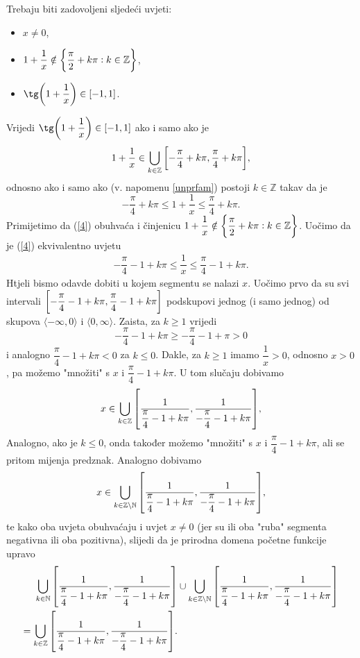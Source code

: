 \documentclass{book}
\let\originalleft\left
\let\originalright\right
\renewcommand{\left}{\mathopen{}\mathclose\bgroup\originalleft}
\renewcommand{\right}{\aftergroup\egroup\originalright}
\renewenvironment{proof}{%
    \vspace{-\parskip}\begin{oldproof}%
    }{%
    \end{oldproof}%
}
\theoremstyle{definition}
\theoremstyle{definition}
\theoremstyle{remark}
\begin{document}
\begin{proof}[Rješenje]
Trebaju biti zadovoljeni sljedeći uvjeti:
\begin{itemize}
\item $x\neq 0$,
\item $1+\dfrac{1}{x}\notin \left\{\dfrac{\pi}{2}+k\pi : k\in \mathbb{Z}\right\}$,
\item $\tg\left(1+\dfrac{1}{x}\right)\in [-1, 1]$.
\end{itemize}
Vrijedi $\tg\left(1+\dfrac{1}{x}\right)\in [-1, 1]$ ako i samo ako je
\begin{gather}
\label{4}
1+\dfrac{1}{x}\in \bigcup_{k\in \mathbb{Z}}{\left[-\dfrac{\pi}{4}+k\pi, \dfrac{\pi}{4}+k\pi\right]},
\end{gather}
odnosno ako i samo ako (v. napomenu \ref{unprfam}) postoji $k\in \mathbb{Z}$ takav da je
$$-\dfrac{\pi}{4}+k\pi\leq 1+\dfrac{1}{x} \leq \dfrac{\pi}{4}+k\pi.$$
Primijetimo da (\ref{4}) obuhvaća i činjenicu $1+\dfrac{1}{x}\notin \left\{\dfrac{\pi}{2}+k\pi : k\in \mathbb{Z}\right\}$. Uočimo da je (\ref{4}) ekvivalentno uvjetu
\begin{gather}
\label{5}
-\dfrac{\pi}{4}-1+k\pi\leq \dfrac{1}{x} \leq \dfrac{\pi}{4}-1+k\pi.
\end{gather}
Htjeli bismo odavde dobiti u kojem segmentu se nalazi $x$. Uočimo prvo da su svi intervali $\left[-\dfrac{\pi}{4}-1+k\pi, \dfrac{\pi}{4}-1+k\pi\right]$ podskupovi jednog (i samo jednog) od skupova $\langle -\infty, 0\rangle$ i $\langle 0, \infty\rangle$. Zaista, za $k\geq 1$ vrijedi
$$-\dfrac{\pi}{4}-1+k\pi\geq -\dfrac{\pi}{4}-1+\pi>0$$
i analogno $\dfrac{\pi}{4}-1+k\pi<0$ za $k\leq 0$. Dakle, za $k\geq 1$ imamo $\dfrac{1}{x}>0$, odnosno $x>0$, pa možemo "množiti" s $x$ i $\dfrac{\pi}{4}-1+k\pi$. U tom slučaju dobivamo
$$x\in \bigcup_{k\in \mathbb{Z}}{\left[\dfrac{1}{\dfrac{\pi}{4}-1+k\pi}, \dfrac{1}{-\dfrac{\pi}{4}-1+k\pi}\right]},$$
Analogno, ako je $k\leq 0$, onda također možemo "množiti" s  $x$ i $\dfrac{\pi}{4}-1+k\pi$, ali se pritom mijenja predznak. Analogno dobivamo
$$x\in \bigcup_{k\in \mathbb{Z}\setminus{\mathbb{N}}}{\left[\dfrac{1}{\dfrac{\pi}{4}-1+k\pi}, \dfrac{1}{-\dfrac{\pi}{4}-1+k\pi}\right]},$$
te kako oba uvjeta obuhvaćaju i uvjet $x\neq 0$ (jer su ili oba "ruba" segmenta negativna ili oba pozitivna), slijedi da je prirodna domena početne funkcije upravo 
\begin{align*}
\bigcup_{k\in \mathbb{N}}{\left[\dfrac{1}{\dfrac{\pi}{4}-1+k\pi}, \dfrac{1}{-\dfrac{\pi}{4}-1+k\pi}\right]}&\cup \bigcup_{k\in \mathbb{Z}\setminus{\mathbb{N}}}{\left[\dfrac{1}{\dfrac{\pi}{4}-1+k\pi}, \dfrac{1}{-\dfrac{\pi}{4}-1+k\pi}\right]}\\
=\bigcup_{k\in \mathbb{Z}}{\left[\dfrac{1}{\dfrac{\pi}{4}-1+k\pi}, \dfrac{1}{-\dfrac{\pi}{4}-1+k\pi}\right]}.
\end{align*}
\end{proof}
\end{document}

